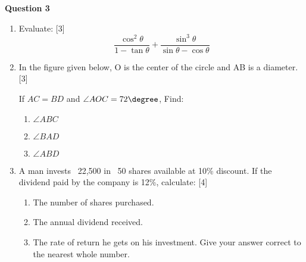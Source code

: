 \newpage
\noindent
\textbf{Question 3}\\
\begin{enumerate}[label=(\roman*)]

    \item Evaluate: \hfill [3]
        \[
            \frac{\cos^2 \theta}{1 - \tan \theta} + 
            \frac{\sin^3 \theta}{\sin \theta - \cos \theta}
        \]

    \item In the figure given below, O is the center of the circle and 
        AB is a diameter. \hfill [3]

        If $AC = BD$ and $\angle AOC = 72 \degree$, Find:
        \begin{multicols}{3}
        \begin{enumerate}
            \setlength\itemsep{0pt}
            \item $\angle ABC$
            \item $\angle BAD$
            \item $\angle ABD$
        \end{enumerate}
        \end{multicols}


    \item A man invests \rupee~22,500 in \rupee~50 shares available at 
        10\% discount. If the dividend paid by the company is 12\%, calculate: \hfill [4]
        \begin{enumerate}
            \setlength\itemsep{0pt}
            \item The number of shares purchased.
            \item The annual dividend received.
            \item The rate of return he gets on his investment. Give your answer 
                correct to the nearest whole number.
        \end{enumerate}


\end{enumerate}


